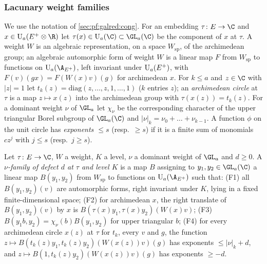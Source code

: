 \subsubsection{Lacunary weight families}

We use the notation of \cref{sec:pf:galred:cong}. For an embedding $\tau\colon E\to\C$ and $x\in\galredU_a(E^+\otimes\R)$ let
$\tau(x)\in\galredU_a(\C)\subset\GL_a(\C)$ be the component of $x$ at $\tau$. A weight $W$ is an algebraic representation,
on a space $W_{\mathrm{sp}}$, of the archimedean group; an algebraic automorphic form of weight $W$ is a linear map $F$
from $W_{\mathrm{sp}}$ to functions on $\galredU_a(\A_{E^+})$, left invariant under $\mathrm{U}_a(E^+)$, with
$F(v)(gx)=F(W(x)v)(g)$ for archimedean $x$. For $k\le a$ and $z\in\C$
with $|z|=1$ let $t_k(z)=\mathrm{diag}(z,\dots,z,1,\dots,1)$ ($k$ entries $z$); an \emph{archimedean circle} at $\tau$ is a
map $z\mapsto x(z)$ into the archimedean group with $\tau(x(z))=t_k(z)$. For a dominant weight $\nu$ of $\GL_a$ let
$\chi_\nu$ be the corresponding character of the upper triangular Borel subgroup of $\GL_a(\C)$ and
$|\nu|_k=\nu_0+\dots+\nu_{k-1}$. A function $\phi$ on the unit circle has \emph{exponents $\le s$} (resp.\ $\ge s$) if it is
a finite sum of monomials $cz^j$ with $j\le s$ (resp.\ $j\ge s$).

\begin{definition}[Families]\label{pf:galred:fam}
Let $\tau\colon E\to\C$, $W$ a weight, $K$ a level, $\nu$ a dominant weight of $\GL_a$ and $d\ge0$. A \emph{$\nu$-family
of defect $d$ at $\tau$ and level $K$} is a map $B$ assigning to $y_1,y_2\in\GL_a(\C)$ a linear map $B(y_1,y_2)$ from
$W_{\mathrm{sp}}$ to functions on $\galredU_a(\A_{E^+})$ such that: (F1) all $B(y_1,y_2)(v)$ are automorphic forms, right
invariant under $K$, lying in a fixed finite-dimensional space; (F2) for archimedean $x$, the right translate of
$B(y_1,y_2)(v)$ by $x$ is $B(\tau(x)y_1,\tau(x)y_2)(W(x)v)$; (F3) $B(y_1b,y_2)=\chi_\nu(b)B(y_1,y_2)$ for upper triangular
$b$; (F4) for every archimedean circle $x(z)$ at $\tau$ for $t_k$, every $v$ and $g$, the function $z\mapsto
B(t_k(z)y_1,t_k(z)y_2)(W(x(z))v)(g)$ has exponents $\le|\nu|_k+d$, and $z\mapsto B(1,t_k(z)y_2)(W(x(z))v)(g)$ has exponents
$\ge-d$.
\end{definition}

